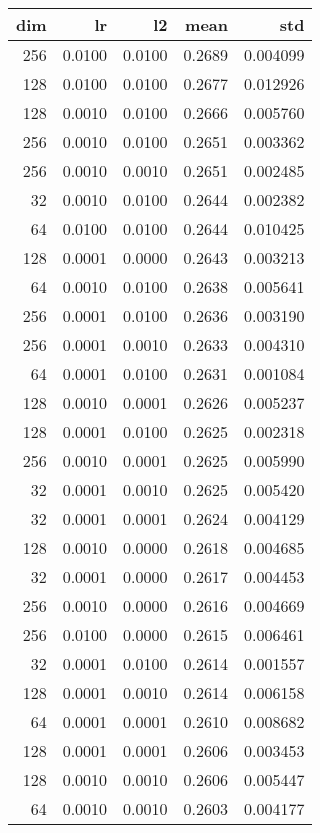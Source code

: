 \begin{tabular}{rrrrr}
\toprule
 dim &      lr &      l2 &    mean &       std \\
\midrule
 256 &  0.0100 &  0.0100 &  0.2689 &  0.004099 \\
 128 &  0.0100 &  0.0100 &  0.2677 &  0.012926 \\
 128 &  0.0010 &  0.0100 &  0.2666 &  0.005760 \\
 256 &  0.0010 &  0.0100 &  0.2651 &  0.003362 \\
 256 &  0.0010 &  0.0010 &  0.2651 &  0.002485 \\
  32 &  0.0010 &  0.0100 &  0.2644 &  0.002382 \\
  64 &  0.0100 &  0.0100 &  0.2644 &  0.010425 \\
 128 &  0.0001 &  0.0000 &  0.2643 &  0.003213 \\
  64 &  0.0010 &  0.0100 &  0.2638 &  0.005641 \\
 256 &  0.0001 &  0.0100 &  0.2636 &  0.003190 \\
 256 &  0.0001 &  0.0010 &  0.2633 &  0.004310 \\
  64 &  0.0001 &  0.0100 &  0.2631 &  0.001084 \\
 128 &  0.0010 &  0.0001 &  0.2626 &  0.005237 \\
 128 &  0.0001 &  0.0100 &  0.2625 &  0.002318 \\
 256 &  0.0010 &  0.0001 &  0.2625 &  0.005990 \\
  32 &  0.0001 &  0.0010 &  0.2625 &  0.005420 \\
  32 &  0.0001 &  0.0001 &  0.2624 &  0.004129 \\
 128 &  0.0010 &  0.0000 &  0.2618 &  0.004685 \\
  32 &  0.0001 &  0.0000 &  0.2617 &  0.004453 \\
 256 &  0.0010 &  0.0000 &  0.2616 &  0.004669 \\
 256 &  0.0100 &  0.0000 &  0.2615 &  0.006461 \\
  32 &  0.0001 &  0.0100 &  0.2614 &  0.001557 \\
 128 &  0.0001 &  0.0010 &  0.2614 &  0.006158 \\
  64 &  0.0001 &  0.0001 &  0.2610 &  0.008682 \\
 128 &  0.0001 &  0.0001 &  0.2606 &  0.003453 \\
 128 &  0.0010 &  0.0010 &  0.2606 &  0.005447 \\
  64 &  0.0010 &  0.0010 &  0.2603 &  0.004177 \\

\end{tabular}
